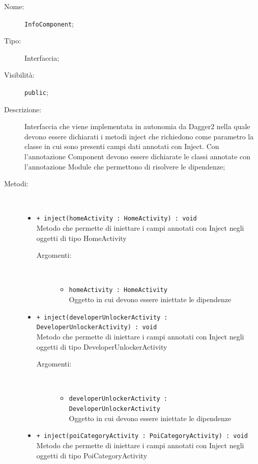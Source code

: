 \documentclass[../DefinizioneDiProdotto.tex]{subfiles}
\begin{document}
\begin{description}
	\item[Nome:] \texttt{InfoComponent};
	\item[Tipo:] Interfaccia;
	\item[Visibilità:] \texttt{public};
	\item[Descrizione:] Interfaccia che viene implementata in autonomia da Dagger2 nella quale devono essere dichiarati
	i metodi inject che richiedono come parametro la classe in cui sono presenti campi dati annotati con Inject. Con l'annotazione Component devono essere dichiarate le classi annotate con l'annotazione Module che permettono di risolvere le dipendenze;
	\item[Metodi:] \
	\begin{itemize}
		\item \texttt{+ inject(homeActivity : HomeActivity) : void}\\
		Metodo che permette di iniettare i campi annotati con Inject negli oggetti di tipo HomeActivity
		\begin{description}
			\item[Argomenti:] \
			\begin{itemize}
				\item \texttt{homeActivity : HomeActivity}\\
				Oggetto in cui devono essere iniettate le dipendenze\end{itemize}
		\end{description}
		\item \texttt{+ inject(developerUnlockerActivity : DeveloperUnlockerActivity) : void}\\
		Metodo che permette di iniettare i campi annotati con Inject negli oggetti di tipo DeveloperUnlockerActivity
		\begin{description}
			\item[Argomenti:] \
			\begin{itemize}
				\item \texttt{developerUnlockerActivity : DeveloperUnlockerActivity}\\
				Oggetto in cui devono essere iniettate le dipendenze\end{itemize}
		\end{description}
		\item \texttt{+ inject(poiCategoryActivity : PoiCategoryActivity) : void}\\
		Metodo che permette di iniettare i campi annotati con Inject negli oggetti di tipo PoiCategoryActivity
		\begin{description}

\end{description}
\end{itemize}
\end{description}
\end{document}
